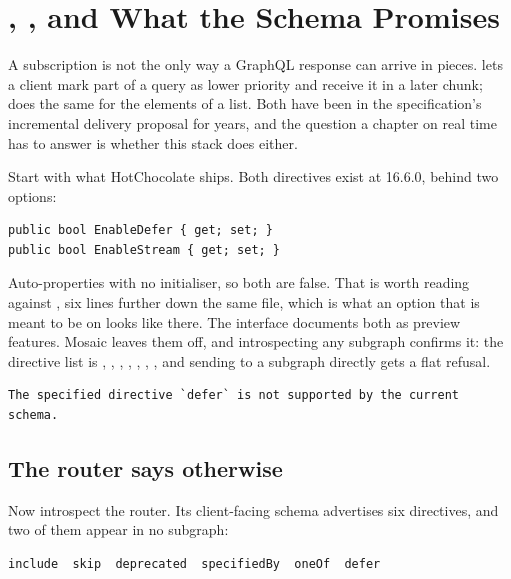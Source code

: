 \section{, , and What the Schema Promises}
\label{sec:ch14-defer-and-stream}
%

A subscription is not the only way a GraphQL response can arrive in pieces.
 lets a client mark part of a query as lower priority and receive
it in a later chunk;  does the same for the elements of a list.
Both have been in the specification's incremental delivery proposal for years,
and the question a chapter on real time has to answer is whether this stack
does either.

Start with what HotChocolate ships. Both directives exist at 16.6.0, behind two
options:

\begin{verbatim}
public bool EnableDefer { get; set; }
public bool EnableStream { get; set; }
\end{verbatim}

%
Auto-properties with no initialiser, so both are false. That is worth reading
against , six lines further
down the same file, which is what an option that is meant to be on looks like
there. The interface documents both as preview features. Mosaic leaves
them off, and introspecting any subgraph confirms it: the directive list is
, , , , ,
, , and sending  to a subgraph
directly gets a flat refusal.

\begin{verbatim}
The specified directive `defer` is not supported by the current schema.
\end{verbatim}

\subsection*{The router says otherwise}

%
Now introspect the router. Its client-facing schema advertises six directives,
and two of them appear in no subgraph:

\begin{verbatim}
include  skip  deprecated  specifiedBy  oneOf  defer
\end{verbatim}

